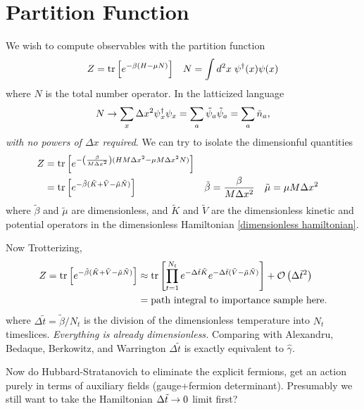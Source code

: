 \section{Partition Function}

We wish to compute observables with the partition function
\begin{align}
	Z
	&=
	\text{tr}\left[e^{-\beta(H-\mu N)}\right]
	&
	N = \int d^2x\; \psi{}^{\dagger}(x)\psi(x)
\end{align}
where $N$ is the total number operator.
In the latticized language 
\begin{align}
	N
	\rightarrow
	\sum_x \Delta x^2 \psi{}^{\dagger}_x \psi_x
	=
	\sum_a \tilde{\psi}_a \tilde{\psi}_a
	=
	\sum_a \tilde{n}_a,
\end{align}
\emph{with no powers of $\Delta x$ required}.
We can try to isolate the dimensionful quantities
\begin{align}
	Z
	&=
	\text{tr}\left[e^{-\left(\frac{\beta}{M\Delta x^2}\right)(HM\Delta x^2 -\mu M \Delta x^2 N)}\right]
\\
	&=
	\text{tr}\left[e^{-\tilde{\beta}(\tilde{K}+\tilde{V}-\tilde{\mu} \tilde{N})}\right]
	&
	\tilde{\beta} &= \frac{\beta}{M \Delta x^2}
	&
	\tilde{\mu}   &= \mu M \Delta x^2
\end{align}
where $\tilde{\beta}$ and $\tilde{\mu}$ are dimensionless, and $\tilde{K}$ and $\tilde{V}$ are the dimensionless kinetic and potential operators in the dimensionless Hamiltonian \eqref{dimensionless hamiltonian}.

Now Trotterizing,
\begin{align}
	Z
	=
	\text{tr}\left[e^{-\tilde{\beta}(\tilde{K}+\tilde{V}-\tilde{\mu} \tilde{N})}\right]
	&\approx
	\text{tr}\left[\prod_{t=1}^{N_t} e^{-\Delta \tilde{t} \tilde{K}} e^{-\Delta\tilde{t}(\tilde{V}-\tilde{\mu}\tilde{N})}\right] + \mathcal{O}\left(\Delta\tilde{t}^2\right)
	\\
	&=
	\textrm{path integral to importance sample here.}
\end{align}
where $\Delta\tilde{t} = \tilde{\beta}/N_t$ is the division of the dimensionless temperature into $N_t$ timeslices.
\emph{Everything is already dimensionless.}
Comparing with Alexandru, Bedaque, Berkowitz, and Warrington $\Delta\tilde{t}$ is exactly equivalent to $\hat{\gamma}$.

Now do Hubbard-Stratanovich to eliminate the explicit fermions, get an action purely in terms of auxiliary fields (gauge+fermion determinant).
Presumably we still want to take the Hamiltonian $\Delta\tilde{t}\rightarrow0$ limit first?

